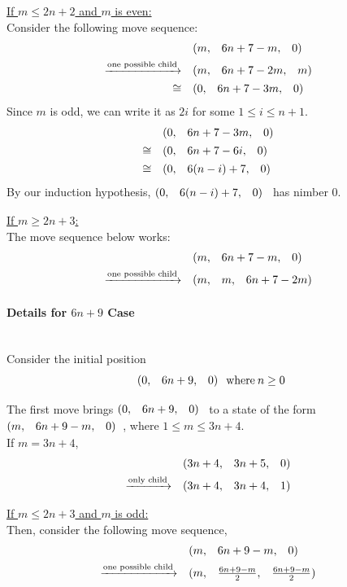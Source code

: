 \documentclass{article}
\makeatletter
\newcommand{\game}[3]{\begin{array}{@{}*6r}(#1, & #2, & #3)\end{array}}
\makeatother
\begin{document}
\bigskip
\underline{If $m \leq 2n + 2$ and $m$ is even:} \\
Consider the following move sequence:
\begin{align*}
  & \game{m}{6n+7-m}{0} \\
  \xrightarrow{\text{one possible child}} \quad & 
  \game{m}{6n+7-2m}{m} \\
  \cong \quad & 
  \game{0}{6n+7-3m}{0} \\
\end{align*}
Since $m$ is odd, we can write it as $2i$ for some $1\leq i\leq n+1$.
\begin{align*}
  & \game{0}{6n+7-3m}{0} \\
  \cong \quad & \game{0}{6n+7-6i}{0} \\
  \cong \quad & \game{0}{6(n-i)+7}{0} \\
\end{align*}
By our induction hypothesis, $\game{0}{6(n-i)+7}{0}$ has nimber $0$.

\bigskip
\underline{If $m \geq 2n + 3$:} \\
The move sequence below works:
\begin{align*}
  & \game{m}{6n+7-m}{0} \\
  \xrightarrow{\text{one possible child}} \quad & 
  \game{m}{m}{6n+7-2m}
\end{align*}
\newpage

\paragraph{Details for $6n+9$ Case}\mbox{}\\
Consider the initial position
\begin{equation*}
  \game{0}{6n+9}{0} \: \text{where} \: n \geq 0
\end{equation*}

\medskip
The first move brings $\game{0}{6n+9}{0}$ to a state of the form
$\game{m}{6n+9-m}{0}$, where $1 \leq m \leq 3n+4$. \\
If $m = 3n + 4$,
\begin{align*}
  & \game{3n+4}{3n+5}{0} \\
  \xrightarrow{\text{only child}} \quad & 
  \game{3n+4}{3n+4}{1}
\end{align*}

\bigskip
\underline{If $m \leq 2n + 3$ and $m$ is odd:} \\
Then, consider the following move sequence,
\begin{align*}
  & \game{m}{6n+9-m}{0} \\
  \xrightarrow{\text{one possible child}} \quad & 
  \game{m}{\frac{6n+9-m}{2}}{\frac{6n+9-m}{2}}
\end{align*}
\end{document}
